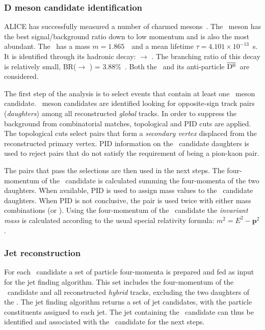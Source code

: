\documentclass[12pt, a4paper, twoside, titlepage]{article}
\begin{document}
\subsubsection{D meson candidate identification}
ALICE has successfully measured a number of charmed mesons~\cite{ALICE:2012d, ALICE:2012e}.
The \Dzero\ meson has the best signal/background ratio down to low momentum and
is also the most abundant. The \Dzero\ has a mass $m=1.865$~\GeVcsq\ and a mean lifetime $\tau=4.101 \times 10^{-13}$~s.
It is identified through its hadronic decay: \Dzero $\rightarrow$ \pip \kam. The branching ratio of this decay
is relatively small, BR(\Dzero $\rightarrow$ \pip \kam) = 3.88\%~\cite{PDG:2014}. Both the \Dzero\ and its
anti-particle $\overline{\mathrm{D^{0}}}$~are considered.

The first step of the analysis is to select events that contain at least one \Dzero\ meson candidate.
\Dzero\ meson candidates are identified looking for opposite-sign track pairs (\emph{daughters}) among all reconstructed \emph{global} tracks.
In order to suppress the background from combinatorial matches, topological and PID cuts are applied.
The topological cuts select pairs that form a \emph{secondary vertex} displaced from the reconstructed
primary vertex. 
PID information on the \Dzero\ candidate daughters is used to reject pairs that do not satisfy the requirement of being a pion-kaon pair.

The pairs that pass the selections are then used in the next steps.
The four-momentum of the \Dzero\ candidate is calculated summing the four-momenta of the two daughters.
When available, PID is used to assign mass values to the \Dzero\ candidate daughters. When PID is not conclusive,
the pair is used twice with either mass combinations (\pip \kam or \pim \kap). Using the four-momentum of the \Dzero\ candidate
the \emph{invariant mass} is calculated according to the usual special relativity formula: $m^2 = E^2 - \bm{p}^2$.

\subsubsection{Jet reconstruction}
For each \Dzero\ candidate a set of particle four-momenta is prepared and fed as input for the jet finding algorithm.
This set includes the four-momentum of the \Dzero\ candidate and all reconstructed \emph{hybrid} tracks,
excluding the two daughters of the \Dzero. The jet finding algorithm returns a set of jet candidates, with the particle constituents
assigned to each jet. The jet containing the \Dzero\ candidate can thus be identified and associated with the \Dzero\ candidate for the next steps.
\end{document}
